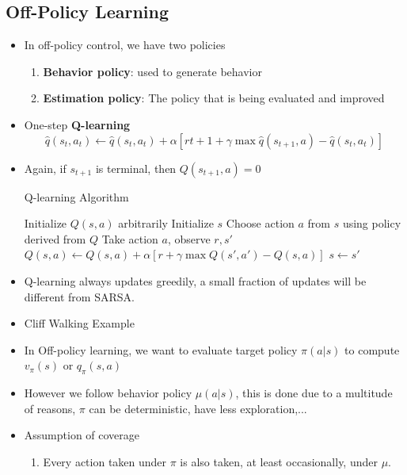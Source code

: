 \documentclass[a4paper]{article}
\begin{document}
\subsection{Off-Policy Learning}
\begin{itemize}
    \item In off-policy control, we have two policies
    \begin{enumerate}
        \item \textbf{Behavior policy}: used to generate behavior
        \item \textbf{Estimation policy}: The policy that is being evaluated and improved
    \end{enumerate}
    \item One-step \textbf{Q-learning}
    \begin{equation*}
        \hat{q}(s_t,a_t)\gets \hat{q}(s_t,a_t)+\alpha[r{t+1}+\gamma \max{\hat{q}(s_{t+1},a)}-\hat{q}(s_t,a_t)]
    \end{equation*}
    \item Again, if $s_{t+1}$ is terminal, then $Q(s_{t+1},a)=0$
    \begin{algorithm}[H]
        \caption{Q-learning Algorithm}
        \begin{algorithmic}[1]
            \State Initialize $Q(s,a)$ arbitrarily
                \State Initialize $s$
                \Repeat
                    \State Choose action $a$ from $s$ using policy derived from $Q$
                    \State Take action $a$, observe $r,s'$
                    \State $Q(s,a)\gets Q(s,a)+\alpha[r+\gamma \max{Q(s',a')}-Q(s,a)]$
                    \State $s\gets s'$
            \EndFor
        \end{algorithmic}
    \end{algorithm}
    \item Q-learning always updates greedily, a small fraction of updates will be different from SARSA.
    \item Cliff Walking Example
    \item In Off-policy learning, we want to evaluate target policy $\pi(a|s)$ to compute $v_\pi(s)$ or $q_\pi(s,a)$
    \item However we follow behavior policy $\mu(a|s)$, this is done due to a multitude of reasons, $\pi$ can be deterministic, have less exploration,...
    \item Assumption of coverage
    \begin{enumerate}
        \item Every action taken under $\pi$ is also taken, at least occasionally, under $\mu$.

\end{enumerate}
\end{itemize}
\end{document}
